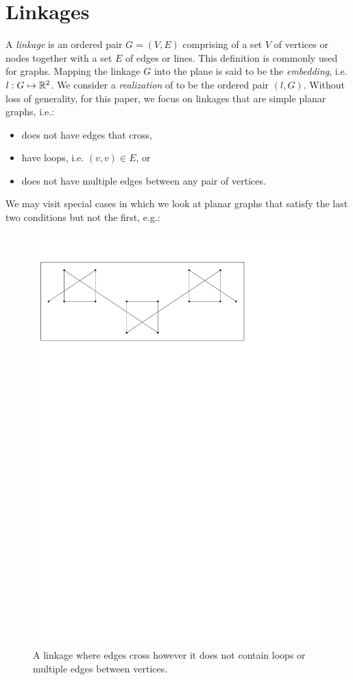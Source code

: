 \section{Linkages}
A \textit{linkage} is an ordered pair $G = (V,E)$ comprising of a set $V$ of vertices or nodes 
together with a set $E$ of edges or lines. This definition is commonly used for graphs.  Mapping 
the linkage $G$ into the plane is said to be the \textit{embedding}, i.e. $l : G \mapsto 
{\mathbb{R}}^2$.  We consider a \textit{realization} of to be the ordered pair $\left( l, G \right)$. 
Without loss of generality, for this paper, we focus on linkages that are simple planar  graphs, 
i.e.:
\begin{itemize}
\item[\rn{1}] does not have edges that cross,
\item[\rn{2}] have loops, i.e. $(v,v) \in E$, or
\item[\rn{3}] does not have multiple edges between any pair of vertices.
\end{itemize}
We may visit special cases in which we look at planar graphs that satisfy the last two conditions 
but not the first, e.g.:
\begin{figure}[h]
\begin{center}
\includegraphics[scale=1]{graphics/crossingEdgeLinkage.pdf}
\end{center} 
\caption{A linkage where edges cross however it does not contain loops or multiple edges between 
vertices.}
\label{fig:linkage-3}
\end{figure}
